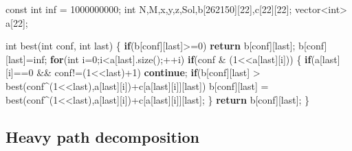 \documentclass[10pt,]{article}
\newenvironment{Shaded}{}{}
\newcommand{\KeywordTok}[1]{\textcolor[rgb]{0.00,0.44,0.13}{\textbf{{#1}}}}
\newcommand{\DataTypeTok}[1]{\textcolor[rgb]{0.56,0.13,0.00}{{#1}}}
\newcommand{\DecValTok}[1]{\textcolor[rgb]{0.25,0.63,0.44}{{#1}}}
\newcommand{\NormalTok}[1]{{#1}}
\begin{document}
\begin{Shaded}
\begin{Highlighting}[]
\DataTypeTok{const} \DataTypeTok{int} \NormalTok{inf = }\DecValTok{1000000000}\NormalTok{;}
\DataTypeTok{int} \NormalTok{N,M,x,y,z,Sol,b[}\DecValTok{262150}\NormalTok{][}\DecValTok{22}\NormalTok{],c[}\DecValTok{22}\NormalTok{][}\DecValTok{22}\NormalTok{];}
\NormalTok{vector<}\DataTypeTok{int}\NormalTok{> a[}\DecValTok{22}\NormalTok{];}

\DataTypeTok{int} \NormalTok{best(}\DataTypeTok{int} \NormalTok{conf, }\DataTypeTok{int} \NormalTok{last) \{}
  \KeywordTok{if}\NormalTok{(b[conf][last]>=}\DecValTok{0}\NormalTok{)}
    \KeywordTok{return} \NormalTok{b[conf][last];}
  \NormalTok{b[conf][last]=inf;}
  \KeywordTok{for}\NormalTok{(}\DataTypeTok{int} \NormalTok{i=}\DecValTok{0}\NormalTok{;i<a[last].size();++i)}
    \KeywordTok{if}\NormalTok{(conf & (}\DecValTok{1}\NormalTok{<<a[last][i])) \{}
      \KeywordTok{if}\NormalTok{(a[last][i]==}\DecValTok{0} \NormalTok{&& conf!=(}\DecValTok{1}\NormalTok{<<last)+}\DecValTok{1}\NormalTok{)}
        \KeywordTok{continue}\NormalTok{;}
      \KeywordTok{if}\NormalTok{(b[conf][last] > best(conf^(}\DecValTok{1}\NormalTok{<<last),a[last][i])+c[a[last][i]][last])}
        \NormalTok{b[conf][last] = best(conf^(}\DecValTok{1}\NormalTok{<<last),a[last][i])+c[a[last][i]][last];}
    \NormalTok{\}}
  \KeywordTok{return} \NormalTok{b[conf][last];}
\NormalTok{\}}
\end{Highlighting}
\end{Shaded}

\subsection{Heavy path decomposition}
\end{document}
